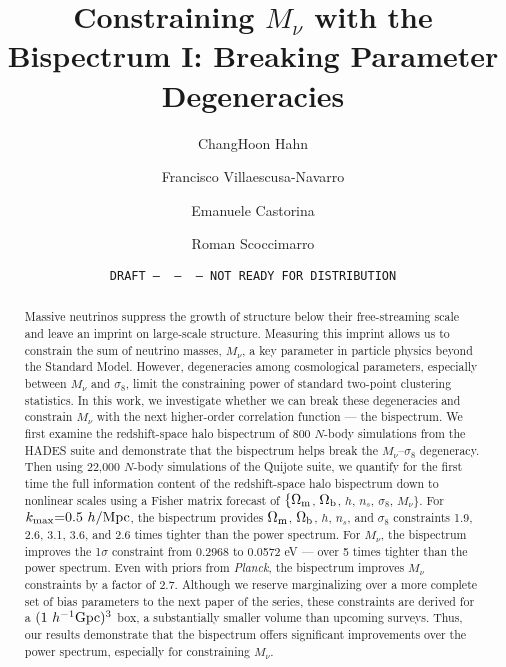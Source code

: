 \documentclass[12pt, letterpaper, preprint]{aastex62}
\newcommand{\Om}{\Omega_{\rm m}}
\newcommand{\Ob}{\Omega_{\rm b}}
\newcommand{\smnu}{M_\nu}
\newcommand{\sig}{\sigma_8}
\newcommand{\mpc}{h/{\rm Mpc}}
\begin{document}
\sloppy\sloppypar\frenchspacing 

\title{Constraining $\smnu$ with the Bispectrum I: Breaking Parameter Degeneracies} 
\date{\texttt{DRAFT~---~\githash~---~\gitdate~---~NOT READY FOR DISTRIBUTION}}

\author{ChangHoon Hahn}

\author{Francisco Villaescusa-Navarro} 

\author{Emanuele Castorina} 

\author{Roman Scoccimarro} 

\begin{abstract}
    Massive neutrinos suppress the growth of structure below their free-streaming scale and leave an 
    imprint on large-scale structure. Measuring this imprint allows us to constrain the sum of neutrino 
    masses, $\smnu$, a key parameter in particle physics beyond the Standard Model. However, degeneracies 
    among cosmological parameters, especially between $\smnu$ and $\sig$, limit the constraining power 
    of standard two-point clustering statistics. In this work, we investigate whether we can break these 
    degeneracies and constrain $\smnu$ with the next higher-order correlation function --- the bispectrum. 
    We first examine the redshift-space halo bispectrum of $800$ $N$-body simulations from the HADES suite 
    and demonstrate that the bispectrum helps break the $\smnu$--$\sig$ degeneracy. Then using 22,000
    $N$-body simulations of the Quijote suite, we quantify for the first time the full information content 
    of the redshift-space halo bispectrum down to nonlinear scales using a Fisher matrix forecast of 
    $\{\Om$, $\Ob$, $h$, $n_s$, $\sig$, $\smnu\}$. For $k_{\rm max}{=}0.5~\mpc$, the bispectrum provides 
    $\Om$, $\Ob$, $h$, $n_s$, and $\sig$ constraints 1.9, 2.6, 3.1, 3.6, and 2.6 times tighter than the 
    power spectrum. For $\smnu$, the bispectrum improves the 1$\sigma$ constraint from 
    0.2968 to 0.0572 eV --- over 5 times tighter than the power spectrum. Even with priors from {\em Planck}, 
    the bispectrum improves $\smnu$ constraints by a factor of 2.7. Although we reserve marginalizing 
    over a more complete set of bias parameters to the next paper of the series, these constraints 
    are derived for a $(1~h^{-1}{\rm Gpc})^3$ box, a substantially smaller volume than upcoming surveys. 
    Thus, our results demonstrate that the bispectrum offers significant improvements over the power 
    spectrum, especially for constraining $\smnu$.  
\end{abstract}
\end{document}
